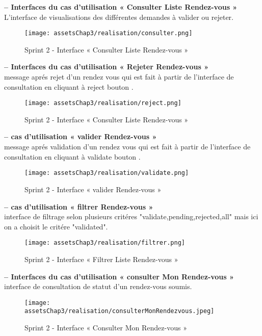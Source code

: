 \textbf{– Interfaces du cas d'utilisation « Consulter Liste Rendez-vous »}\\
L'interface de visualisations des différentes demandes à valider ou rejeter.
\begin{figure}[H]
\centering
\texttt{[image: assetsChap3/realisation/consulter.png]}
\caption{ Sprint 2 - Interface « Consulter Liste Rendez-vous » }
\end{figure}




\textbf{– Interfaces du cas d'utilisation « Rejeter Rendez-vous »}\\
message aprés rejet d'un rendez vous qui est fait à partir de l'interface de consultation en cliquant à reject bouton .
\begin{figure}[H]
\centering
\texttt{[image: assetsChap3/realisation/reject.png]}
\caption{ Sprint 2 - Interface « Consulter Liste Rendez-vous » }
\end{figure}



\textbf{–  cas d'utilisation « valider Rendez-vous »}\\
message aprés validation d'un rendez vous qui est fait à partir de l'interface de consultation en cliquant à validate bouton .
\begin{figure}[H]
\centering
\texttt{[image: assetsChap3/realisation/validate.png]}
\caption{ Sprint 2 - Interface « valider Rendez-vous » }
\end{figure}


\textbf{–  cas d'utilisation « filtrer Rendez-vous »}\\
interface de filtrage selon plusieurs critéres "validate,pending,rejected,all" mais ici on a choisit le critére "validated".
\begin{figure}[H]
\centering
\texttt{[image: assetsChap3/realisation/filtrer.png]}
\caption{ Sprint 2 - Interface « Filtrer Liste Rendez-vous » }
\end{figure}



\textbf{– Interfaces du cas d'utilisation « consulter Mon Rendez-vous »}\\
interface de consultation de statut d'un rendez-vous soumis.
\begin{figure}[H]
\centering
\texttt{[image: assetsChap3/realisation/consulterMonRendezvous.jpeg]}
\caption{ Sprint 2 - Interface « Consulter Mon Rendez-vous » }
\end{figure}




